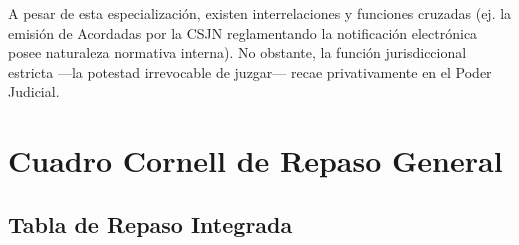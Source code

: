 \documentclass[12pt,oneside]{book}
\begin{document}
A pesar de esta especialización, existen interrelaciones y funciones cruzadas (ej. la emisión de Acordadas por la CSJN reglamentando la notificación electrónica posee naturaleza normativa interna). No obstante, la función jurisdiccional estricta —la potestad irrevocable de juzgar— recae privativamente en el Poder Judicial.

\chapter{Cuadro Cornell de Repaso General}

\section{Tabla de Repaso Integrada}
\end{document}
